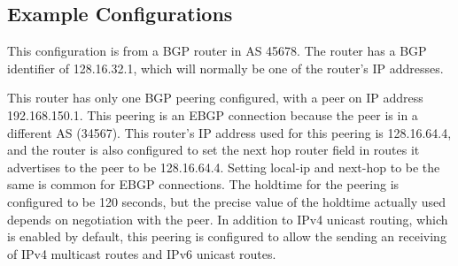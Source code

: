 \subsection{Example Configurations}
\vspace{0.1in}
\noindent{}
\vspace{0.1in}

This configuration is from a BGP router in AS 45678.  The router has a
BGP identifier of 128.16.32.1, which will normally be one of the router's
IP addresses.

This router has only one BGP peering configured, with a peer on IP
address 192.168.150.1.  This peering is an EBGP connection because the
peer is in a different AS (34567).  This router's IP address used for
this peering is 128.16.64.4, and the router is also configured to set
the next hop router field in routes it advertises to the peer to be
128.16.64.4.  Setting local-ip and next-hop to be the same is common
for EBGP connections.  The holdtime for the peering is configured to
be 120 seconds, but the precise value of the holdtime actually used
depends on negotiation with the peer.  In addition to IPv4 unicast
routing, which is enabled by default, this peering is configured to
allow the sending an receiving of IPv4 multicast routes and IPv6
unicast routes.

